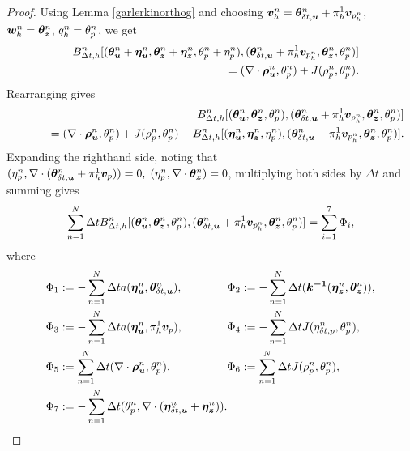 \begin{proof}
Using  Lemma \ref{garlerkinorthog} and choosing $\boldsymbol{v}_{h}^n=\boldsymbol{\theta}^{n}_{\delta t ,\boldsymbol{u}} + \pi_{h}^{1} \boldsymbol{v}_{p_h^n}$, $\boldsymbol{w}_{h}^n=  \boldsymbol{\theta}^{n}_{\boldsymbol{z}} $, ${q}_{h}^n=  {\theta}^{n}_{{p}}$,  we get
\begin{eqnarray*}
&&B_{\Delta t,h}^{n}[({\boldsymbol{\theta}^{n}_{\boldsymbol{u}}+\boldsymbol{\eta}^{n}_{\boldsymbol{u}}}, {\boldsymbol{\theta}^{n}_{\boldsymbol{z}}+\boldsymbol{\eta}^{n}_{\boldsymbol{z}}}, {\theta}^{n}_{{p}}+{\eta}^{n}_{{p}}),
                      (\boldsymbol{\theta}^{n}_{\delta t ,\boldsymbol{u}} + \pi_{h}^{1} \boldsymbol{v}_{p_h^n},  \boldsymbol{\theta}^{n}_{\boldsymbol{z}}, {\theta}^{n}_{{p}})] \\
&& \qquad = (\nabla \cdot \boldsymbol{\rho}_{\boldsymbol{u}}^{n}, {\theta}^{n}_{{p}})+  J({\rho}_{p}^{n}, {\theta}^{n}_{{p}}).
\end{eqnarray*}
Rearranging gives
\begin{eqnarray*}
&&B_{\Delta t,h}^{n}[({\boldsymbol{\theta}^{n}_{\boldsymbol{u}}}, {\boldsymbol{\theta}^{n}_{\boldsymbol{z}}}, {\theta}^{n}_{{p}}),(\boldsymbol{\theta}^{n}_{\delta t ,\boldsymbol{u}} + \pi_{h}^{1} \boldsymbol{v}_{p_h^n},  \boldsymbol{\theta}^{n}_{\boldsymbol{z}}, {\theta}^{n}_{{p}})] \\
&& \qquad = (\nabla \cdot \boldsymbol{\rho}_{\boldsymbol{u}}^{n}, {\theta}^{n}_{{p}})+  J({\rho}_{p}^{n}, {\theta}^{n}_{{p}})
         - B_{\Delta t,h}^{n}[({\boldsymbol{\eta}^{n}_{\boldsymbol{u}}}, {\boldsymbol{\eta}^{n}_{\boldsymbol{z}}},{\eta}^{n}_{{p}}),(\boldsymbol{\theta}^{n}_{\delta t ,\boldsymbol{u}} + \pi_{h}^{1} \boldsymbol{v}_{p_h^n},  \boldsymbol{\theta}^{n}_{\boldsymbol{z}}, {\theta}^{n}_{{p}})].
\end{eqnarray*}
Expanding the righthand side, noting that $({\eta}^{n}_{{p}}, \nabla \cdot( \boldsymbol{\theta}^{n}_{\delta t ,\boldsymbol{u}}+ \pi_{h}^{1} \boldsymbol{v}_{p}))=0,\;( {\eta}^{n}_{{p}}, \nabla \cdot  \boldsymbol{\theta}^{n}_{\boldsymbol{z}} )=0$, multiplying both sides by $\Delta t$ and summing gives
\begin{eqnarray}
\label{theta_bilin}
\sum_{n=1}^N \Delta t B_{\Delta t,h}^{n}[({\auxdispn}, {\auxfluxn}, \auxpn),(\auxdispntime + \projscott \vphn,  \auxfluxn, \auxpn)] \nonumber = \sum_{i=1}^7 \Phi_{i},
\end{eqnarray}
where
\begin{equation*}
\begin{gathered}\begin{aligned}
&\Phi_{1}:= -\sum^{N}_{n=1} \Delta ta({\intdispn},\auxdispntime), \\
&\Phi_{3}:=-\sum^{N}_{n=1} \Delta t a(\intdispn, \projscott \vp), \\
&\Phi_{5}:=  \sum^{N}_{n=1} \Delta t(\nabla \cdot \disptimerrn, \auxpn ), \\
&\Phi_{7}:= -\sum^{N}_{n=1} \Delta t (\auxpn, \nabla\cdot (\intdispntime + \intfluxn)).
\end{aligned}\end{gathered}
\begin{gathered}\begin{aligned}
&\Phi_{2}:= -\sum^{N}_{n=1} \Delta t(\perminv(\intfluxn,  \auxfluxn )), \\
&\Phi_{4}:= -\sum^{N}_{n=1} \Delta t J(\intpntime, \auxpn), \\
&\Phi_{6}:= \sum^{N}_{n=1} \Delta tJ(\ptimerrn, \auxpn), \\
&\phantom{\Phi_{7}:= -\sum^{N}_{n=1} }
\end{aligned}\end{gathered}
\end{equation*}


\end{proof}
